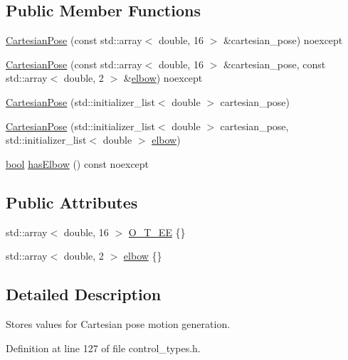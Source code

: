 \subsection*{Public Member Functions}
\begin{DoxyCompactItemize}
\item 
\hyperlink{classfranka_1_1CartesianPose_a5559a53a898f9b369b1df9d51f9351b5}{Cartesian\+Pose} (const std\+::array$<$ double, 16 $>$ \&cartesian\+\_\+pose) noexcept
\item 
\hyperlink{classfranka_1_1CartesianPose_a17272cb33af9aa4b726fa96b31cf0101}{Cartesian\+Pose} (const std\+::array$<$ double, 16 $>$ \&cartesian\+\_\+pose, const std\+::array$<$ double, 2 $>$ \&\hyperlink{classfranka_1_1CartesianPose_abef660743df9cf94d11c556d9c3d25be}{elbow}) noexcept
\item 
\hyperlink{classfranka_1_1CartesianPose_a70b6460e98bc763a49c53accd48d54a2}{Cartesian\+Pose} (std\+::initializer\+\_\+list$<$ double $>$ cartesian\+\_\+pose)
\item 
\hyperlink{classfranka_1_1CartesianPose_ab7fb1dfd7cdb89c0caebab95c669ba49}{Cartesian\+Pose} (std\+::initializer\+\_\+list$<$ double $>$ cartesian\+\_\+pose, std\+::initializer\+\_\+list$<$ double $>$ \hyperlink{classfranka_1_1CartesianPose_abef660743df9cf94d11c556d9c3d25be}{elbow})
\item 
\hyperlink{classbool}{bool} \hyperlink{classfranka_1_1CartesianPose_a5fa9f47dbf73ab45f671d89e11f89ccf}{has\+Elbow} () const noexcept
\end{DoxyCompactItemize}
\subsection*{Public Attributes}
\begin{DoxyCompactItemize}
\item 
std\+::array$<$ double, 16 $>$ \hyperlink{classfranka_1_1CartesianPose_a406e53e3d8fe594a11888f516eb4bf7d}{O\+\_\+\+T\+\_\+\+EE} \{\}
\item 
std\+::array$<$ double, 2 $>$ \hyperlink{classfranka_1_1CartesianPose_abef660743df9cf94d11c556d9c3d25be}{elbow} \{\}
\end{DoxyCompactItemize}


\subsection{Detailed Description}
Stores values for Cartesian pose motion generation. 

Definition at line 127 of file control\+\_\+types.\+h.



